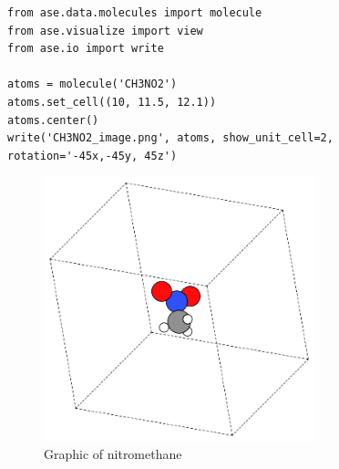 \documentclass[11pt]{article}
\begin{document}
\begin{verbatim}
from ase.data.molecules import molecule
from ase.visualize import view
from ase.io import write

atoms = molecule('CH3NO2')
atoms.set_cell((10, 11.5, 12.1))
atoms.center()
write('CH3NO2_image.png', atoms, show_unit_cell=2, rotation='-45x,-45y, 45z')
\end{verbatim}

\begin{figure}[H]
\centering
\includegraphics[width=0.7\textwidth]{./CH3NO2_image.png}
\caption{Graphic of nitromethane}
\end{figure}
\end{document}
